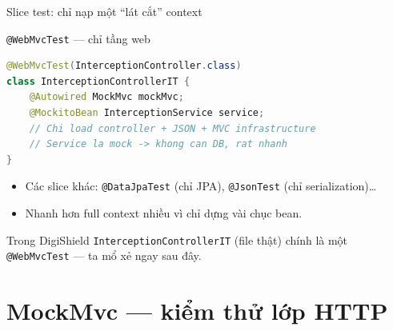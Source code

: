 \documentclass[aspectratio=169,12pt]{beamer}
\begin{document}
\begin{frame}[fragile]{Slice test: chỉ nạp một ``lát cắt'' context}
  \begin{block}{\texttt{@WebMvcTest} --- chỉ tầng web}
\begin{lstlisting}[language=Java,style=code]
@WebMvcTest(InterceptionController.class)
class InterceptionControllerIT {
    @Autowired MockMvc mockMvc;
    @MockitoBean InterceptionService service;
    // Chi load controller + JSON + MVC infrastructure
    // Service la mock -> khong can DB, rat nhanh
}
\end{lstlisting}
  \end{block}
  \begin{itemize}\small
    \item Các slice khác: \texttt{@DataJpaTest} (chỉ JPA),
      \texttt{@JsonTest} (chỉ serialization)\ldots
    \item Nhanh hơn full context nhiều vì chỉ dựng vài chục bean.
  \end{itemize}
  \begin{exampleblock}{Trong DigiShield}
    \texttt{InterceptionControllerIT} (file thật) chính là một
    \texttt{@WebMvcTest} --- ta mổ xẻ ngay sau đây.
  \end{exampleblock}
\end{frame}

\section{MockMvc --- kiểm thử lớp HTTP}
\end{document}
